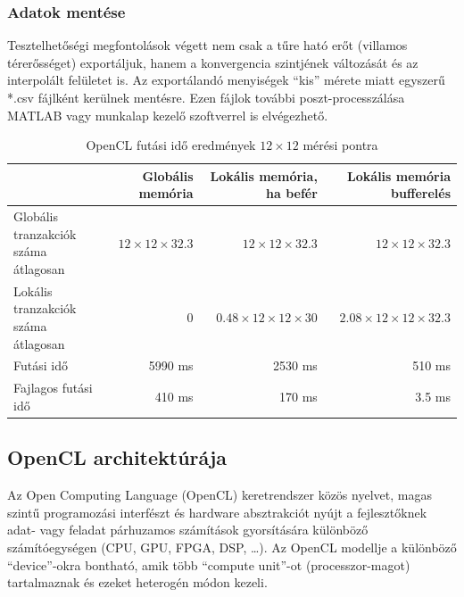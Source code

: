	\subsubsection{Adatok mentése}
	Tesztelhetőségi megfontolások végett nem csak a tűre ható erőt (villamos
	térerősséget) exportáljuk, hanem a konvergencia szintjének változását és az
	interpolált felületet is. Az exportálandó menyiségek ``kis''
	mérete miatt egyszerű *.csv fájlként kerülnek mentésre. Ezen fájlok további
	poszt-processzálása MATLAB vagy munkalap kezelő szoftverrel is elvégezhető.
	
	\begin{table}[!Ht]
		\caption{\scriptsize OpenCL futási idő eredmények $12\times12$ mérési pontra}
		\label{table:openresult}
		\centering
		\begin{tabular}{l|r|r|r}
		 & Globális memória & Lokális memória, ha befér & Lokális memória bufferelés\\ \hline
		\parbox{2.5cm}{Globális tranzakciók száma átlagosan} & $12 \times 12\times 32.3$
		& $12 \times 12 \times 32.3$ & $12 \times 12 \times 32.3$\\
		\parbox{2.5cm}{Lokális tranzakciók száma átlagosan} & 0 &
		$0.48 \times 12 \times 12 \times 30$ & $2.08 \times 12 \times12 \times 32.3$\\
		Futási idő & 5990 ms & 2530 ms & 510 ms\\
		Fajlagos futási idő & 410 ms & 170 ms & 3.5 ms 
		\end{tabular}
	\end{table}

\subsection{OpenCL architektúrája}
	Az Open Computing Language (OpenCL) keretrendszer \cite{opencl} közös
	nyelvet, magas szintű programozási interfészt és hardware absztrakciót nyújt a fejlesztőknek
	adat- vagy feladat párhuzamos számítások gyorsítására különböző
	számítóegységen (CPU, GPU, FPGA, DSP, \ldots).
	Az OpenCL modellje a különböző ``device''-okra bontható, amik több ``compute unit''-ot
	(processzor-magot) tartalmaznak és ezeket heterogén módon kezeli. 
	
